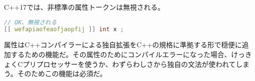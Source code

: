 %

C++17では、非標準の属性トークンは無視される。

\begin{lstlisting}[language=C++]
// OK、無視される
[[ wefapiaofeaofjaopfij ]] int x ;
\end{lstlisting}

属性はC++コンパイラーによる独自拡張をC++の規格に準拠する形で穏便に追加するための機能だ。その属性のためにコンパイルエラーになった場合、けっきょくCプリプロセッサーを使うか、わずらわしさから独自の文法が使われてしまう。そのためこの機能は必須だ。
